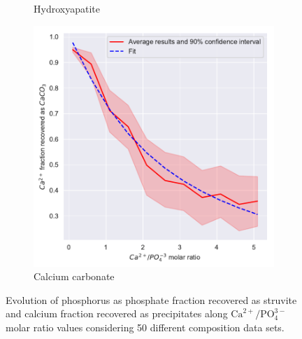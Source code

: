 \documentclass[10pt,a4paper]{article}
\begin{document}
\begin{figure}[H]
\begin{subfigure}[t]{0.32\textheight}
		\caption{Hydroxyapatite}
		\label{fig:estimation_Ca_HAP}
	\end{subfigure} 
	\begin{subfigure}[t]{0.32\textheight}
		\includegraphics[width=\textwidth]{x_plotCaCO3Yield_Ca}
		\caption{Calcium carbonate}
		\label{fig:estimation_Ca_CaCO3}
	\end{subfigure}
	
	\caption{Evolution of phosphorus as phosphate fraction recovered as struvite and calcium fraction recovered as precipitates along $\text{Ca}^{2+}/\text{PO}_{4}^{3-}$ molar ratio values considering 50 different composition data sets.}
	\label{fig:estimation_Ca_ca}
\end{figure}
\end{document}
